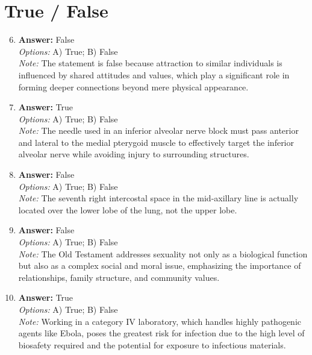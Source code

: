 \documentclass[12pt]{article}
\begin{document}
\section*{True / False}
\begin{enumerate}[label=\arabic*.]
\setcounter{enumi}{5}
\item \textbf{Answer:} False
\\ \textit{Options:} A) True; B) False
\\ \textit{Note:} The statement is false because attraction to similar individuals is influenced by shared attitudes and values, which play a significant role in forming deeper connections beyond mere physical appearance.
\item \textbf{Answer:} True
\\ \textit{Options:} A) True; B) False
\\ \textit{Note:} The needle used in an inferior alveolar nerve block must pass anterior and lateral to the medial pterygoid muscle to effectively target the inferior alveolar nerve while avoiding injury to surrounding structures.
\item \textbf{Answer:} False
\\ \textit{Options:} A) True; B) False
\\ \textit{Note:} The seventh right intercostal space in the mid-axillary line is actually located over the lower lobe of the lung, not the upper lobe.
\item \textbf{Answer:} False
\\ \textit{Options:} A) True; B) False
\\ \textit{Note:} The Old Testament addresses sexuality not only as a biological function but also as a complex social and moral issue, emphasizing the importance of relationships, family structure, and community values.
\item \textbf{Answer:} True
\\ \textit{Options:} A) True; B) False
\\ \textit{Note:} Working in a category IV laboratory, which handles highly pathogenic agents like Ebola, poses the greatest risk for infection due to the high level of biosafety required and the potential for exposure to infectious materials.
\end{enumerate}
\end{document}
